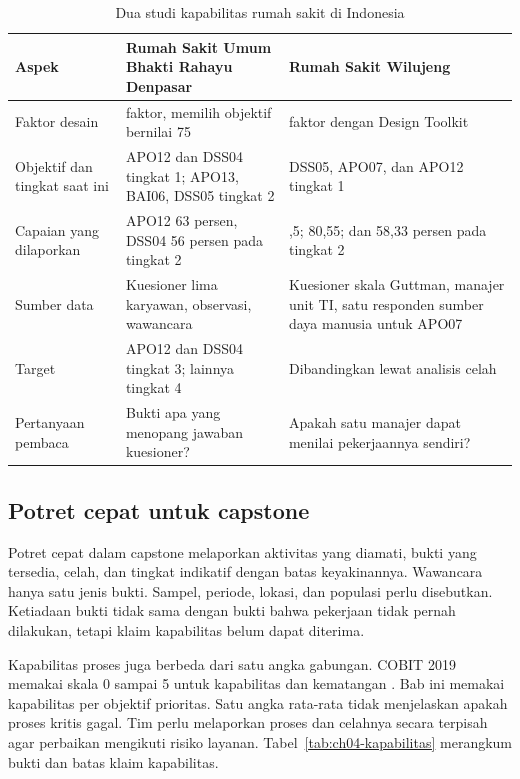 \begin{table}[!htb]
  \centering\footnotesize
  \caption{Dua studi kapabilitas rumah sakit di Indonesia}\label{tab:ch04-studi}
  \begin{tabularx}{\textwidth}{|>{\raggedright\arraybackslash}p{}|>{\raggedright\arraybackslash}X|>{\raggedright\arraybackslash}X|}
    \hline
    \textbf{Aspek} & \textbf{Rumah Sakit Umum Bhakti Rahayu Denpasar \cite{c04-denpasar}} & \textbf{Rumah Sakit Wilujeng \cite{c04-wilujeng}} \\ \hline
    Faktor desain & 11 faktor, memilih objektif bernilai 75 & 10 faktor dengan Design Toolkit \\ \hline
    Objektif dan tingkat saat ini & APO12 dan DSS04 tingkat 1; APO13, BAI06, DSS05 tingkat 2 & DSS05, APO07, dan APO12 tingkat 1 \\ \hline
    Capaian yang dilaporkan & APO12 63 persen, DSS04 56 persen pada tingkat 2 & 61,5; 80,55; dan 58,33 persen pada tingkat 2 \\ \hline
    Sumber data & Kuesioner lima karyawan, observasi, wawancara & Kuesioner skala Guttman, manajer unit TI, satu responden sumber daya manusia untuk APO07 \\ \hline
    Target & APO12 dan DSS04 tingkat 3; lainnya tingkat 4 & Dibandingkan lewat analisis celah \\ \hline
    Pertanyaan pembaca & Bukti apa yang menopang jawaban kuesioner? & Apakah satu manajer dapat menilai pekerjaannya sendiri? \\ \hline
  \end{tabularx}
\end{table}

\subsection*{Potret cepat untuk capstone}

Potret cepat dalam capstone melaporkan aktivitas yang diamati, bukti yang tersedia, celah, dan tingkat indikatif dengan batas keyakinannya. Wawancara hanya satu
jenis bukti. Sampel, periode, lokasi, dan populasi perlu disebutkan. Ketiadaan bukti tidak sama dengan bukti bahwa pekerjaan tidak pernah dilakukan, tetapi klaim
kapabilitas belum dapat diterima.

Kapabilitas proses juga berbeda dari satu angka gabungan. COBIT 2019 memakai skala 0 sampai 5 untuk kapabilitas dan kematangan \cite{c04-perbandingan}. Bab ini memakai
kapabilitas per objektif prioritas. Satu angka rata-rata tidak menjelaskan apakah proses kritis gagal. Tim perlu melaporkan proses dan celahnya secara terpisah agar
perbaikan mengikuti risiko layanan. Tabel~\ref{tab:ch04-kapabilitas} merangkum bukti dan batas klaim kapabilitas.

